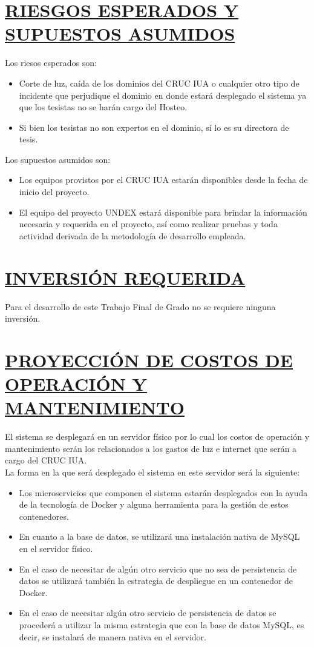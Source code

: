 \section*{\underline{RIESGOS ESPERADOS Y SUPUESTOS ASUMIDOS}}
Los riesos esperados son:
\begin{itemize}
	\item Corte de luz, caída de los dominios del CRUC IUA o cualquier otro tipo de incidente que perjudique el dominio en donde estará desplegado el sistema ya que los tesistas no se harán cargo del Hosteo.
	\item Si bien los tesistas no son expertos en el dominio, sí lo es su directora de tesis.\\
\end{itemize}

Los supuestos asumidos son:
\begin{itemize}
	\item Los equipos provistos por el CRUC IUA estarán disponibles desde la fecha de inicio del proyecto.
	\item El equipo del proyecto UNDEX estará disponible para brindar la información necesaria y requerida en el proyecto, así como realizar pruebas y toda actividad derivada de la metodología de desarrollo empleada.\\
\end{itemize}


\section*{\underline{INVERSIÓN REQUERIDA}}
Para el desarrollo de este Trabajo Final de Grado no se requiere ninguna inversión.

\section*{\underline{PROYECCIÓN DE COSTOS DE OPERACIÓN Y MANTENIMIENTO}}
El sistema se desplegará en un servidor físico por lo cual los costos de operación y mantenimiento serán los relacionados a los gastos de luz e internet que serán a cargo del CRUC IUA. \\

La forma en la que será desplegado el sistema en este servidor será la siguiente:
\begin{itemize}
	\item Los microservicios que componen el sistema estarán desplegados con la ayuda de la tecnología de Docker y alguna herramienta para la gestión de estos contenedores.
	\item En cuanto a la base de datos, se utilizará una instalación nativa de MySQL en el servidor físico.
	\item En el caso de necesitar de algún otro servicio que no sea de persistencia de datos se utilizará también la estrategia de despliegue en un contenedor de Docker.
	\item En el caso de necesitar algún otro servicio de persistencia de datos se procederá a utilizar la misma estrategia que con la base de datos MySQL, es decir, se instalará de manera nativa en el servidor.\\
\end{itemize}

